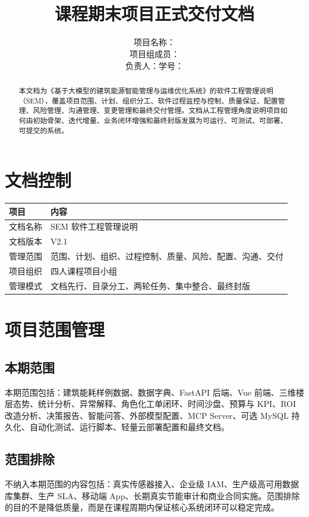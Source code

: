 \documentclass[12pt,a4paper]{ctexart}
\title{
    \vspace{-2em}
    \heiti \zihao{2} \reporttitle \\
    \vspace{1em}
    \zihao{4} 课程期末项目正式交付文档
}
\author{
    \songti \zihao{4}
    项目名称：\projectname \\
    项目组成员：\teamname \\
    负责人：\studentname \quad 学号：\studentid
}
\date{\docdate}
\newcommand{\projectname}{基于大模型的建筑能源智能管理与运维优化系统}
\newcommand{\docversion}{V2.1}
\begin{document}
\maketitle
\thispagestyle{fancy}

\begin{abstract}
本文档为《\projectname》的软件工程管理说明（SEM），覆盖项目范围、计划、组织分工、软件过程监控与控制、质量保证、配置管理、风险管理、沟通管理、变更管理和最终交付管理。文档从工程管理角度说明项目如何由初始骨架、迭代增量、业务闭环增强和最终封版发展为可运行、可测试、可部署、可提交的系统。
\end{abstract}

\tableofcontents
\newpage

\section{文档控制}
\begin{longtable}{p{4cm}p{10.5cm}}
\toprule
项目 & 内容 \\
\midrule
文档名称 & SEM 软件工程管理说明 \\
文档版本 & \docversion \\
管理范围 & 范围、计划、组织、过程控制、质量、风险、配置、沟通、交付 \\
项目组织 & 四人课程项目小组 \\
管理模式 & 文档先行、目录分工、两轮任务、集中整合、最终封版 \\
\bottomrule
\end{longtable}

\section{项目范围管理}
\subsection{本期范围}
本期范围包括：建筑能耗样例数据、数据字典、FastAPI 后端、Vue 前端、三维楼层态势、统计分析、异常解释、角色化工单闭环、时间沙盘、预算与 KPI、ROI 改造分析、决策报告、智能问答、外部模型配置、MCP Server、可选 MySQL 持久化、自动化测试、运行脚本、轻量云部署配置和最终文档。

\subsection{范围排除}
不纳入本期范围的内容包括：真实传感器接入、企业级 IAM、生产级高可用数据库集群、生产 SLA、移动端 App、长期真实节能审计和商业合同实施。范围排除的目的不是降低质量，而是在课程周期内保证核心系统闭环可以稳定完成。
\end{document}
